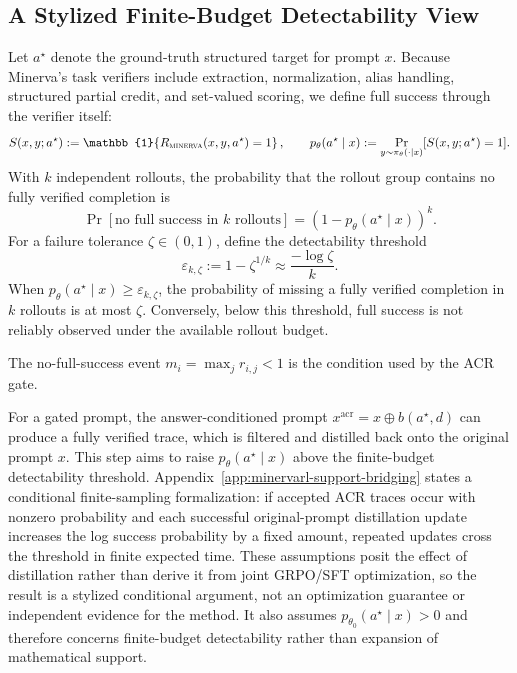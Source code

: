 \subsection{A Stylized Finite-Budget Detectability View}
\label{sec:minervarl-support-bridging}

Let $a^\star$ denote the ground-truth structured target for prompt $x$. Because Minerva's task verifiers include extraction, normalization, alias handling, structured partial credit, and set-valued scoring, we define full success through the verifier itself:
\begin{equation}
    S(x,y;a^\star)
    :=
    \mathbb{1}\!\left\{R_{\textsc{minerva}}(x,y,a^\star)=1\right\},
    \qquad
    p_\theta(a^\star\mid x)
    :=
    \Pr_{y\sim\pi_\theta(\cdot\mid x)}[S(x,y;a^\star)=1].
\end{equation}
With $k$ independent rollouts, the probability that the rollout group contains no fully verified completion is
\begin{equation}
    \Pr[\text{no full success in $k$ rollouts}]
    =
    \left(1-p_\theta(a^\star\mid x)\right)^k .
\end{equation}
For a failure tolerance $\zeta\in(0,1)$, define the detectability threshold
\begin{equation}
    \varepsilon_{k,\zeta}
    :=
    1-\zeta^{1/k}
    \approx
    \frac{-\log \zeta}{k}.
\end{equation}
When $p_\theta(a^\star\mid x)\ge\varepsilon_{k,\zeta}$, the probability of missing a fully verified completion in $k$ rollouts is at most $\zeta$. Conversely, below this threshold, full success is not reliably observed under the available rollout budget.

The no-full-success event $m_i=\max_j r_{i,j}<1$ is the condition used by the ACR gate.

For a gated prompt, the answer-conditioned prompt $x^{\mathrm{acr}}=x\oplus b(a^\star,d)$ can produce a fully verified trace, which is filtered and distilled back onto the original prompt $x$. This step aims to raise $p_\theta(a^\star\mid x)$ above the finite-budget detectability threshold. Appendix~\ref{app:minervarl-support-bridging} states a conditional finite-sampling formalization: if accepted ACR traces occur with nonzero probability and each successful original-prompt distillation update increases the log success probability by a fixed amount, repeated updates cross the threshold in finite expected time. These assumptions posit the effect of distillation rather than derive it from joint GRPO/SFT optimization, so the result is a stylized conditional argument, not an optimization guarantee or independent evidence for the method. It also assumes $p_{\theta_0}(a^\star\mid x)>0$ and therefore concerns finite-budget detectability rather than expansion of mathematical support.
